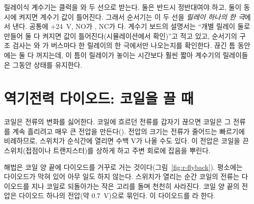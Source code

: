 \Ours 릴레이식 계수기는 클럭을 와  두 선으로 받는다. 둘은 반드시 정반대여야 하고, 둘이
동시에 켜지면 계수기 값이 틀어진다. 그래서 순서기는 이 두 선을 \emph{릴레이 하나의 한 극}에서 낸다. 공통에
+24~V, NO가 , NC가 다. 계수기 보드의 설명서는 ``개별 릴레이 둘로 만들어 둘 다 켜지면 값이
틀어진다(시뮬레이션에서 확인)''고 적고 있고, 순서기의 구조 검사는 와 가 버스마다 한
릴레이의 한 극에서만 나오는지를 확인한다. 끊긴 틈 동안에는 둘 다 꺼지는데, 이 틈이 릴레이가 놓이는 시간보다
훨씬 짧아 계수기의 릴레이들은 그동안 상태를 유지한다.

\section{역기전력 다이오드: 코일을 끌 때}\label{sec:relay-flyback}

\Why 코일은 전류의 변화를 싫어한다. 코일에 흐르던 전류를 갑자기 끊으면 코일은 그 전류를 계속 흘리려고
매우 큰 전압을 만든다(). 전압의 크기는 전류가 줄어드는 빠르기에 비례하므로,
스위치가 순식간에 열리면 수백 V가 나올 수도 있다. 이 전압은 코일을 끈 스위치(접점이나 트랜지스터)를
상하게 하고 주변 회로에 잡음을 뿌린다.

해법은 코일 양 끝에 다이오드를 거꾸로 거는 것이다(그림~\ref{fig:r-flyback}). 평소에는 다이오드가 막혀 있어
아무 일도 하지 않는다. 스위치가 열리는 순간 코일의 전류는 다이오드를 지나 코일로 되돌아가는 작은 고리를
돌며 천천히 사라진다. 코일 양 끝의 전압은 다이오드 하나의 전압(약 0.7~V)으로 묶인다. 이 다이오드를
라 한다.

